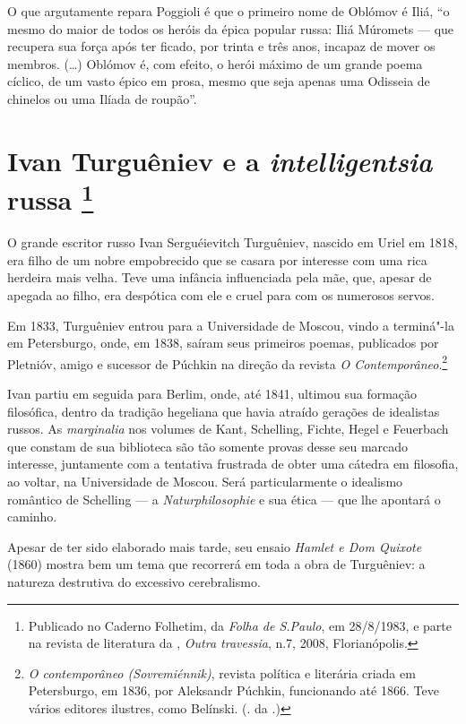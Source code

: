 O que argutamente repara Poggioli é que o primeiro nome de Oblómov é Iliá, ``o mesmo do maior de todos os heróis da épica popular russa: Iliá Múromets --- que recupera sua força após ter ficado, por trinta e três anos, incapaz de mover os membros. (\ldots{}) Oblómov é, com efeito, o herói máximo de um grande poema cíclico, de um vasto épico em prosa, mesmo que seja apenas uma Odisseia de chinelos ou uma Ilíada de roupão''.

\chapter{Ivan Turguêniev e a \emph{intelligentsia} russa \footnote{Publicado no Caderno Folhetim, da \emph{Folha de S.Paulo}, em 28/8/1983, e parte na revista de literatura da {}, \emph{Outra travessia}, n.7, 2008, Florianópolis.}}

O grande escritor russo Ivan Serguéievitch Turguêniev, nascido
em Uriel em 1818, era filho de um nobre empobrecido que se casara
por interesse com uma rica
herdeira mais velha. Teve uma infância influenciada pela mãe, que,
apesar de apegada ao filho, era despótica com ele e cruel para com os numerosos servos.

Em 1833, Turguêniev entrou para a Universidade de Moscou, vindo a terminá"-la em
Petersburgo, onde, em 1838, saíram seus primeiros poemas, publicados por
Pletnióv, amigo e sucessor de Púchkin na direção da revista \emph{O
Contemporâneo}.\footnote{\emph{O contemporâneo (Sovremiénnik)}, revista política e literária criada em Petersburgo, em 1836, por Aleksandr Púchkin, funcionando até 1866. Teve vários editores ilustres, como Belínski. (. da .)}

Ivan partiu em seguida para Berlim, onde, até 1841, ultimou sua formação
filosófica, dentro da tradição hegeliana que havia atraído gerações de
idealistas russos. As \emph{marginalia} nos volumes de Kant, Schelling,
Fichte, Hegel e Feuerbach que constam de sua biblioteca são tão somente
provas desse seu marcado interesse, juntamente com a tentativa frustrada
de obter uma cátedra em filosofia, ao voltar, na Universidade de
Moscou. Será particularmente o idealismo romântico de Schelling --- a
\emph{Naturphilosophie} e sua ética --- que lhe apontará o caminho.

Apesar de ter sido elaborado mais tarde, seu ensaio \emph{Hamlet e Dom
Quixote} (1860) mostra bem um tema que recorrerá em toda a  obra
de Turguêniev: a natureza destrutiva do excessivo cerebralismo.

